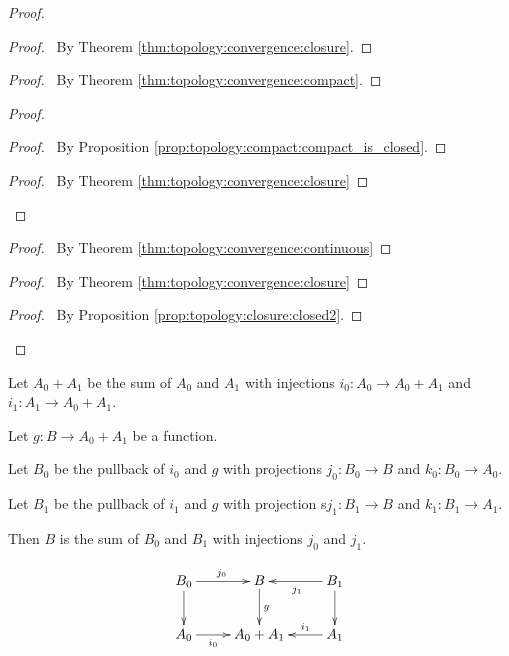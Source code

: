 \begin{proof}
 \pf
 \begin{proof}
   \pf\ By Theorem \ref{thm:topology:convergence:closure}.
 \end{proof}
 \begin{proof}
   \pf\ By Theorem \ref{thm:topology:convergence:compact}.
 \end{proof}
 \begin{proof}
   \begin{proof}
     \pf\ By Proposition \ref{prop:topology:compact:compact_is_closed}.
   \end{proof}
   \qedstep
   \begin{proof}
   \pf\ By Theorem \ref{thm:topology:convergence:closure}
 \end{proof}
 \end{proof}
 \begin{proof}
   \pf\ By Theorem \ref{thm:topology:convergence:continuous}
 \end{proof}
 \begin{proof}
   \pf\ By Theorem \ref{thm:topology:convergence:closure}
 \end{proof}
 \qedstep
 \begin{proof}
   \pf\ By Proposition \ref{prop:topology:closure:closed2}.
 \end{proof}
\end{proof}

\begin{prop}
  Let $A_0 + A_1$ be the sum of $A_0$ and $A_1$ with injections $i_0 : A_0
\rightarrow A_0 + A_1$ and $i_1 : A_1 \rightarrow A_0 + A_1$.

Let $g : B \rightarrow A_0 + A_1$ be a function.

Let $B_0$ be the pullback of $i_0$ and $g$ with projections $j_0 : B_0
\rightarrow B$ and $k_0 : B_0 \rightarrow A_0$.

Let $B_1$ be the pullback of $i_1$ and $g$ with projection s$j_1 : B_1
\rightarrow B$ and $k_1 : B_1 \rightarrow A_1$.

Then $B$ is the sum of $B_0$ and $B_1$ with injections $j_0$ and $j_1$.

  \[ \xymatrix{
    B_0 \ar[r]^{j_0} \ar[d] & B \ar[d]^g & B_1 \ar[l]^{j_1} \ar[d] \\
    A_0 \ar[r]_-{i_0} & A_0 + A_1 & A_1 \ar[l]_-{i_1}
  } \]
\end{prop}

